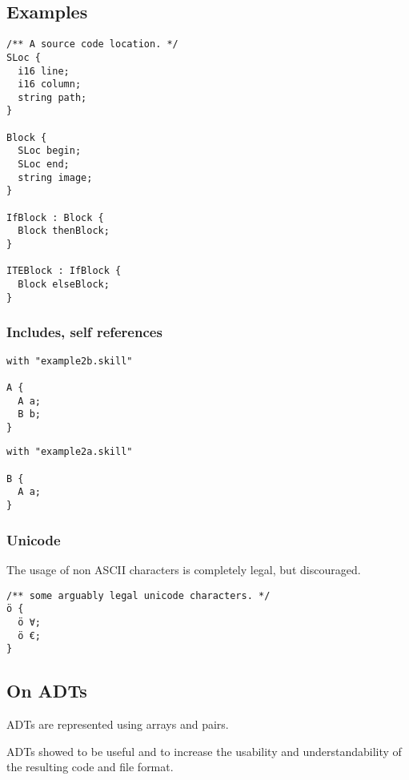 \documentclass[a4paper,10pt]{article}
\begin{document}
\subsection{Examples}

\begin{lstlisting}[label=blockExample,caption=Running Example,language=skill]
/** A source code location. */
SLoc {
  i16 line;
  i16 column;
  string path;
}

Block {
  SLoc begin;
  SLoc end;
  string image;
}

IfBlock : Block {
  Block thenBlock;
}

ITEBlock : IfBlock {
  Block elseBlock;
}
\end{lstlisting}

\subsubsection*{Includes, self references}

\begin{lstlisting}[label=example2a,caption=Example 2a,language=skill]
with "example2b.skill"

A {
  A a;
  B b;
}
\end{lstlisting}

\begin{lstlisting}[label=example2b,caption=Example 2b,language=skill]
with "example2a.skill"

B {
  A a;
}
\end{lstlisting}

\subsubsection*{Unicode}
The usage of non ASCII characters is completely legal, but discouraged.
\begin{lstlisting}[label=unicode,caption=Unicode Support,language=skill]
/** some arguably legal unicode characters. */
ö {
  ö ∀;
  ö €;
}
\end{lstlisting}


\subsection{On ADTs}

ADTs are represented using arrays and pairs.

ADTs showed to be useful and to increase the usability and understandability of the resulting code and file format.

\end{document}
